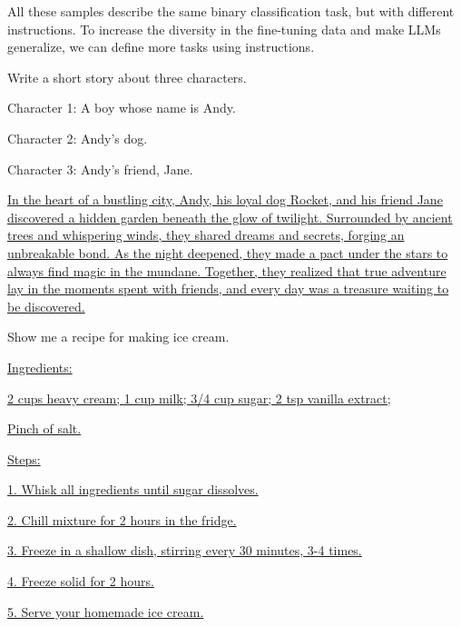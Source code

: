 All these samples describe the same binary classification task, but with different instructions. To increase the diversity in the fine-tuning data and make LLMs generalize, we can define more tasks using instructions.

\vspace{0.5em}
\begin{tcolorbox}
\begin{center}
\parbox{0.9\textwidth}
{
{\color{blue} Write a short story about three characters.}

{\color{blue} Character 1: A boy whose name is Andy.}

{\color{blue} Character 2: Andy's dog.}

{\color{blue} Character 3: Andy's friend, Jane.}

\vspace{0.3em}

\uline{In the heart of a bustling city, Andy, his loyal dog Rocket, and his friend Jane discovered a hidden garden beneath the glow of twilight. Surrounded by ancient trees and whispering winds, they shared dreams and secrets, forging an unbreakable bond. As the night deepened, they made a pact under the stars to always find magic in the mundane. Together, they realized that true adventure lay in the moments spent with friends, and every day was a treasure waiting to be discovered.}
}
\end{center}
\end{tcolorbox}

\vspace{0.5em}
\begin{tcolorbox}
\begin{center}
\parbox{0.9\textwidth}
{
{\color{blue} Show me a recipe for making ice cream.}

\vspace{0.3em}

\underline{Ingredients:}

\underline{2 cups heavy cream; 1 cup milk; 3/4 cup sugar; 2 tsp vanilla extract;}

\underline{Pinch of salt.}

\underline{Steps:}

\underline{1. Whisk all ingredients until sugar dissolves.}

\underline{2. Chill mixture for 2 hours in the fridge.}

\underline{3. Freeze in a shallow dish, stirring every 30 minutes, 3-4 times.}

\underline{4. Freeze solid for 2 hours.}

\underline{5. Serve your homemade ice cream.}
}
\end{center}
\end{tcolorbox}

